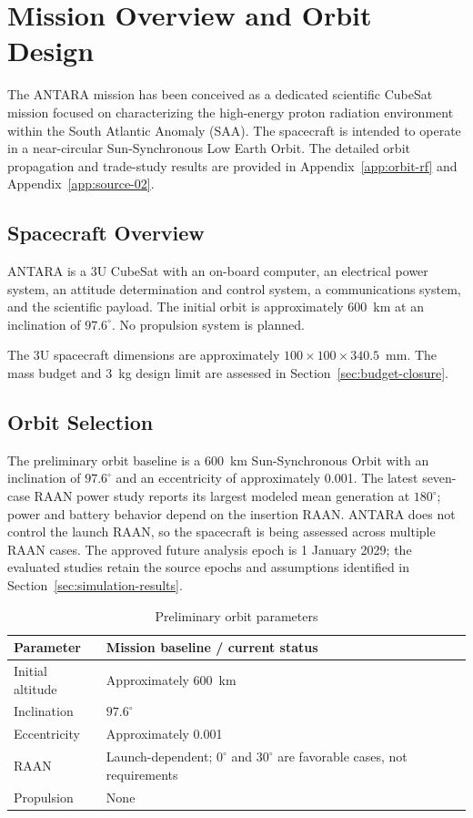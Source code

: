 \section{Mission Overview and Orbit Design}\label{sec:mission-overview}
The ANTARA mission has been conceived as a dedicated scientific CubeSat mission focused on characterizing the high-energy proton radiation environment within the South Atlantic Anomaly (SAA). The spacecraft is intended to operate in a near-circular Sun-Synchronous Low Earth Orbit. The detailed orbit propagation and trade-study results are provided in Appendix~\ref{app:orbit-rf} and Appendix~\ref{app:source-02}.

\subsection{Spacecraft Overview}\label{spacecraft-overview}
ANTARA is a 3U CubeSat with an on-board computer, an electrical power system, an attitude determination and control system, a communications system, and the scientific payload. The initial orbit is approximately 600~km at an inclination of $97.6^\circ$. No propulsion system is planned.

The 3U spacecraft dimensions are approximately $100\times100\times340.5$~mm. The mass budget and 3~kg design limit are assessed in Section~\ref{sec:budget-closure}.

\subsection{Orbit Selection}\label{sec:orbit-design}
The preliminary orbit baseline is a 600~km Sun-Synchronous Orbit with an inclination of $97.6^\circ$ and an eccentricity of approximately 0.001. The latest seven-case RAAN power study reports its largest modeled mean generation at $180^\circ$; power and battery behavior depend on the insertion RAAN. ANTARA does not control the launch RAAN, so the spacecraft is being assessed across multiple RAAN cases. The approved future analysis epoch is 1 January 2029; the evaluated studies retain the source epochs and assumptions identified in Section~\ref{sec:simulation-results}.

\begin{table}[htbp]\centering
\caption{Preliminary orbit parameters}\label{tab:orbit-baseline}
\begin{tabularx}{\linewidth}{@{}lX@{}}\toprule
Parameter & Mission baseline / current status \\ \midrule
Initial altitude & Approximately 600~km \\
Inclination & $97.6^\circ$ \\
Eccentricity & Approximately 0.001 \\
RAAN & Launch-dependent; $0^\circ$ and $30^\circ$ are favorable cases, not requirements \\
Propulsion & None \\
\bottomrule\end{tabularx}\end{table}


